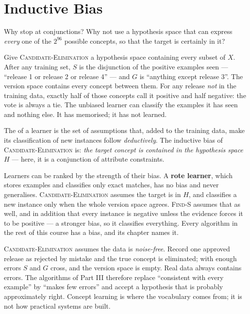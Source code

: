 \section{Inductive Bias}

Why stop at conjunctions? Why not use a hypothesis space that can express
\emph{every} one of the $2^{96}$ possible concepts, so that the target is
certainly in it?

\begin{conceptbox}
Give \textsc{Candidate-Elimination} a hypothesis space containing every subset
of $X$. After any training set, $S$ is the disjunction of the positive examples
seen --- ``release 1 or release 2 or release 4'' --- and $G$ is ``anything except
release 3''. The version space contains every concept between them. For any
release \emph{not} in the training data, exactly half of those concepts call it
positive and half negative: the vote is always a tie. The unbiased learner can
classify the examples it has seen and nothing else. It has memorised; it has not
learned.
\end{conceptbox}

\begin{definitionbox}
The  of a learner is the set of assumptions that, added to
the training data, make its classification of new instances follow
\emph{deductively}. The inductive bias of \textsc{Candidate-Elimination} is:
\emph{the target concept is contained in the hypothesis space $H$} --- here, it is
a conjunction of attribute constraints.
\end{definitionbox}

Learners can be ranked by the strength of their bias. A \textbf{rote learner},
which stores examples and classifies only exact matches, has no bias and never
generalises. \textsc{Candidate-Elimination} assumes the target is in $H$, and
classifies a new instance only when the whole version space agrees.
\textsc{Find-S} assumes that as well, and in addition that every instance is
negative unless the evidence forces it to be positive --- a stronger bias, so it
classifies everything. Every algorithm in the rest of this course has a bias,
and its chapter names it.

\begin{alertbox}
\textsc{Candidate-Elimination} assumes the data is \emph{noise-free}. Record one
approved release as rejected by mistake and the true concept is eliminated; with
enough errors $S$ and $G$ cross, and the version space is empty. Real data always
contains errors. The algorithms of Part III therefore replace ``consistent with
every example'' by ``makes few errors'' and accept a hypothesis that is probably
approximately right. Concept learning is where the vocabulary comes from; it is
not how practical systems are built.
\end{alertbox}

